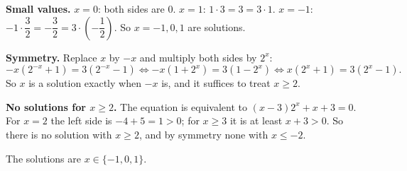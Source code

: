 \textbf{Small values.} $x=0$: both sides are $0$. $x=1$: $1\cdot3=3=3\cdot1$. $x=-1$: $-1\cdot\dfrac{3}{2}=-\dfrac{3}{2}=3\cdot\left(-\dfrac{1}{2}\right)$. So $x=-1,0,1$ are solutions.

\textbf{Symmetry.} Replace $x$ by $-x$ and multiply both sides by $2^x$:
\[
-x\left(2^{-x}+1\right)=3\left(2^{-x}-1\right)\iff -x\left(1+2^x\right)=3\left(1-2^x\right)\iff x\left(2^x+1\right)=3\left(2^x-1\right).
\]
So $x$ is a solution exactly when $-x$ is, and it suffices to treat $x\ge2$.

\textbf{No solutions for $x\ge2$.} The equation is equivalent to $(x-3)2^x+x+3=0$. For $x=2$ the left side is $-4+5=1>0$; for $x\ge3$ it is at least $x+3>0$. So there is no solution with $x\ge2$, and by symmetry none with $x\le-2$.

The solutions are $\boxed{x\in\{-1,0,1\}}$.
